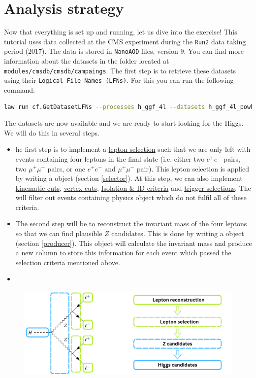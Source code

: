 \section{Analysis strategy}

Now that everything is set up and running, let us dive into the exercise! This tutorial uses data collected at the CMS experiment during the \texttt{Run2} data taking period (2017). The data is stored in \texttt{NanoAOD} files, version 9. You can find more information about the datasets in the folder   located at \texttt{modules/cmsdb/cmsdb/campaings}. The first step is to retrieve these datasets using their \texttt{Logical File Names (LFNs)}. For this you can run the following command:
\begin{lstlisting}[language=bash]
law run cf.GetDatasetLFNs --processes h_ggf_4l --datasets h_ggf_4l_powheg
\end{lstlisting}

The datasets are now available and we are ready to start looking for the Higgs.  We will do this in several steps. 

\begin{itemize}
\item he first step is to implement a \underline{lepton selection} such that we are only left with events containing four leptons in the final state (i.e. either two $e^+e^-$ pairs,  two $\mu^+\mu^-$ pairs, or one $e^+e^-$ and $\mu^+\mu^-$ pair). This lepton selection is applied by writing a  object (section \ref{selector}). At this step, we can also implement \underline{kinematic cuts}, \underline{vertex cuts}, \underline{Isolation \& ID criteria} and \underline{trigger selections}.  The  will filter out events containing physics object which do not fulfil all of these criteria.

\item The second step will be to reconstruct the invariant mass of the four leptons so that we can find plausible $Z$ candidates. This is done by writing a  object (section \ref{producer}). This object will calculate the invariant mass and produce a new column to store this information for each event which passed the selection criteria mentioned above.

\item 

\end{itemize}

\begin{figure}[!h]
    \centering
    \includegraphics[scale=0.62]{images/strategy.png}
\end{figure}